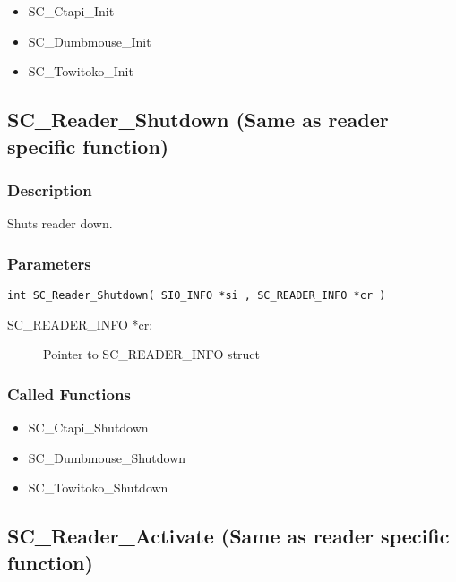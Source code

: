 \documentclass[a4paper,oneside]{article}
\begin{document}
\begin{itemize}
\item SC\_Ctapi\_Init
\item SC\_Dumbmouse\_Init
\item SC\_Towitoko\_Init
\end{itemize}


\subsection{SC\_Reader\_Shutdown (Same as reader specific function)}

\subsubsection*{Description}

Shuts reader down.

\subsubsection*{Parameters}

\begin{verbatim}
int SC_Reader_Shutdown( SIO_INFO *si , SC_READER_INFO *cr )
\end{verbatim}

\begin{description}
\item[SC\_READER\_INFO *cr:] Pointer to SC\_READER\_INFO struct
\end{description}

\subsubsection*{Called Functions}

\begin{itemize}
\item SC\_Ctapi\_Shutdown
\item SC\_Dumbmouse\_Shutdown
\item SC\_Towitoko\_Shutdown
\end{itemize}


\subsection{SC\_Reader\_Activate (Same as reader specific function)}
\end{document}
